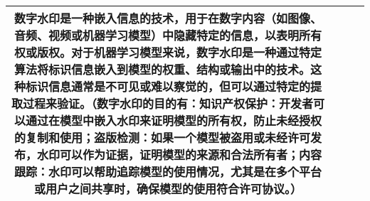 \documentclass[lettersize,journal]{IEEEtran}
\begin{document}
\begin{longtable}{|c|p{3cm}|c|p{12cm}|}
   数字水印是一种嵌入信息的技术，用于在数字内容（如图像、音频、视频或机器学习模型）中隐藏特定的信息，以表明所有权或版权。对于机器学习模型来说，数字水印是一种通过特定算法将标识信息嵌入到模型的权重、结构或输出中的技术。这种标识信息通常是不可见或难以察觉的，但可以通过特定的提取过程来验证。（数字水印的目的有：知识产权保护：开发者可以通过在模型中嵌入水印来证明模型的所有权，防止未经授权的复制和使用；盗版检测：如果一个模型被盗用或未经许可发布，水印可以作为证据，证明模型的来源和合法所有者；内容跟踪：水印可以帮助追踪模型的使用情况，尤其是在多个平台或用户之间共享时，确保模型的使用符合许可协议。） \\ \hline
\end{longtable}
\end{document}
